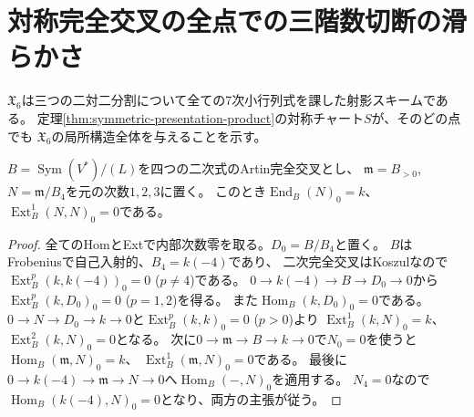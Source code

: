 \section{対称完全交叉の全点での三階数切断の滑らかさ}
\label{sec:ci-global-tangent}
$\mathfrak X_6$は三つの二対二分割について全ての7次小行列式を課した射影スキームである。
定理\ref{thm:symmetric-presentation-product}の対称チャート$S$が、そのどの点でも
$\mathfrak X_6$の局所構造全体を与えることを示す。

\begin{lemma}[中央三次数の次数零剛性]\label{lem:ci-middle-rigidity}
$B=\operatorname{Sym}(V^*)/(L)$を四つの二次式のArtin完全交叉とし、
$\mathfrak m=B_{>0}$, $N=\mathfrak m/B_4$を元の次数$1,2,3$に置く。
このとき$\operatorname{End}_B(N)_0=k$、
$\operatorname{Ext}^1_B(N,N)_0=0$である。
\end{lemma}
\begin{proof}
全てのHomとExtで内部次数零を取る。$D_0=B/B_4$と置く。
$B$はFrobeniusで自己入射的、$B_4=k(-4)$であり、
二次完全交叉はKoszulなので
$\operatorname{Ext}^p_B(k,k(-4))_0=0$ ($p\ne4$)である。
$0\to k(-4)\to B\to D_0\to0$から
$\operatorname{Ext}^p_B(k,D_0)_0=0$ ($p=1,2$)を得る。
また$\operatorname{Hom}_B(k,D_0)_0=0$である。
$0\to N\to D_0\to k\to0$と$\operatorname{Ext}^p_B(k,k)_0=0$ ($p>0$)より
$\operatorname{Ext}^1_B(k,N)_0=k$、$\operatorname{Ext}^2_B(k,N)_0=0$となる。
次に$0\to\mathfrak m\to B\to k\to0$で$N_0=0$を使うと
$\operatorname{Hom}_B(\mathfrak m,N)_0=k$、
$\operatorname{Ext}^1_B(\mathfrak m,N)_0=0$である。
最後に$0\to k(-4)\to\mathfrak m\to N\to0$へ$\operatorname{Hom}_B(-,N)_0$を適用する。
$N_4=0$なので$\operatorname{Hom}_B(k(-4),N)_0=0$となり、両方の主張が従う。
\end{proof}

